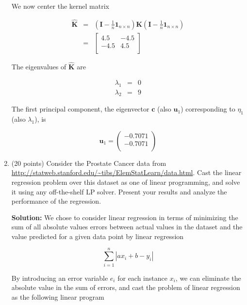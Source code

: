 \documentclass[11pt]{article}
\begin{document}
\begin{enumerate}
We now center the kernel matrix

\begin{eqnarray*}
\hat{\mathbf{K}} &=& \left( \mathbf{I} - \frac{1}{n} \mathbf{1}_{n \times n} \right) \mathbf{K} \left( \mathbf{I} - \frac{1}{n} \mathbf{1}_{n \times n} \right) \nonumber \\
&=& \left[
	\begin{array}{rr}
		4.5 & -4.5 \\
		-4.5 & 4.5 \\	
	\end{array}
\right]
\end{eqnarray*}

The eigenvalues of $\hat{\mathbf{K}}$ are

\begin{eqnarray}
\lambda_1 &=& 0 \\
\lambda_2 &=& 9
\end{eqnarray}

The first principal component, the eigenvector $\mathbf{c}$ (also $\mathbf{u}_1$) corresponding to $\eta_1$ (also $\lambda_1$), is

\begin{equation}
\mathbf{u}_1 = \left(
	\begin{array}{r}
		-0.7071 \\
		-0.7071 \\
	\end{array}
\right)
\end{equation}

\item (20 points) Consider the Prostate Cancer data from \url{http://statweb.stanford.edu/~tibs/ElemStatLearn/data.html}. Cast the linear regression problem over this dataset as one of linear programming, and solve it using any off-the-shelf LP solver. Present your results and analyze the performance of the regression.

\textbf{Solution:} We chose to consider linear regression in terms of minimizing the sum of all absolute values errors between actual values in the dataset and the value predicted for a given data point by linear regression

\begin{equation*}
\sum\limits_{i=1}^n | ax_i + b - y_i|
\end{equation*}

By introducing an error variable $e_i$ for each instance $x_i$, we can eliminate the absolute value in the sum of errors, and cast the problem of linear regression as the following linear program


\end{enumerate}
\end{document}
